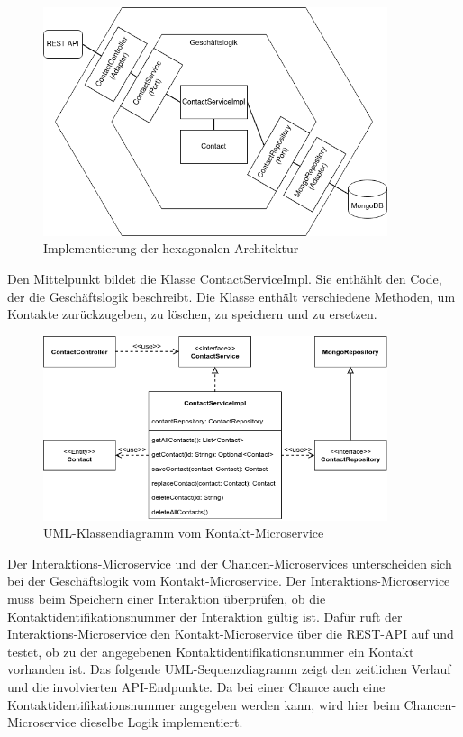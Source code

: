 \begin{figure}[H] 
    \centering
    \includegraphics[width=0.9\textwidth]{figures/HexagonalDesign.png}
    \caption{Implementierung der hexagonalen Architektur}
\end{figure}

Den Mittelpunkt bildet die Klasse ContactServiceImpl. Sie enthählt den Code, der die Geschäftslogik beschreibt. Die Klasse enthält verschiedene Methoden, um Kontakte zurückzugeben, zu löschen, zu speichern und zu ersetzen.

\begin{figure}[H] 
    \centering
    \includegraphics[width=0.9\textwidth]{figures/UMLKlassenDiagrammKontakt.png}
    \caption{\ac{UML}-Klassendiagramm vom Kontakt-Microservice}
\end{figure}

Der Interaktions-Microservice und der Chancen-Microservices unterscheiden sich bei der Geschäftslogik vom Kontakt-Microservice. Der Interaktions-Microservice muss beim Speichern einer Interaktion überprüfen, ob die Kontaktidentifikationsnummer der Interaktion gültig ist. Dafür ruft der Interaktions-Microservice den Kontakt-Microservice über die REST-API auf und testet, ob zu der angegebenen Kontaktidentifikationsnummer ein Kontakt vorhanden ist. Das folgende \ac{UML}-Sequenzdiagramm zeigt den zeitlichen Verlauf und die involvierten \ac{API}-Endpunkte. Da bei einer Chance auch eine Kontaktidentifikationsnummer angegeben werden kann, wird hier beim Chancen-Microservice dieselbe Logik implementiert.

